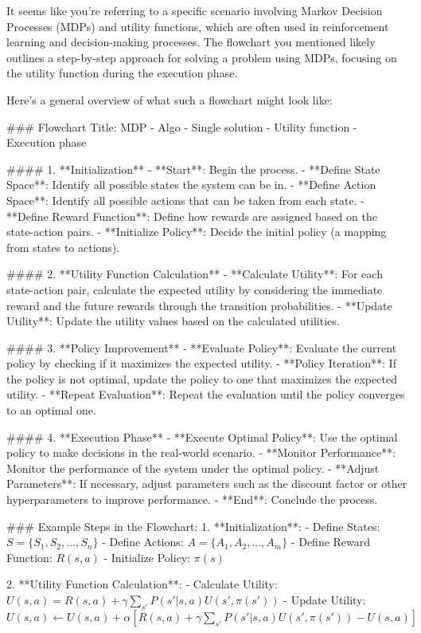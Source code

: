 It seems like you're referring to a specific scenario involving Markov Decision Processes (MDPs) and utility functions, which are often used in reinforcement learning and decision-making processes. The flowchart you mentioned likely outlines a step-by-step approach for solving a problem using MDPs, focusing on the utility function during the execution phase.

Here's a general overview of what such a flowchart might look like:

### Flowchart Title: MDP - Algo - Single solution - Utility function - Execution phase

#### 1. **Initialization**
   - **Start**: Begin the process.
   - **Define State Space**: Identify all possible states the system can be in.
   - **Define Action Space**: Identify all possible actions that can be taken from each state.
   - **Define Reward Function**: Define how rewards are assigned based on the state-action pairs.
   - **Initialize Policy**: Decide the initial policy (a mapping from states to actions).

#### 2. **Utility Function Calculation**
   - **Calculate Utility**: For each state-action pair, calculate the expected utility by considering the immediate reward and the future rewards through the transition probabilities.
   - **Update Utility**: Update the utility values based on the calculated utilities.

#### 3. **Policy Improvement**
   - **Evaluate Policy**: Evaluate the current policy by checking if it maximizes the expected utility.
   - **Policy Iteration**: If the policy is not optimal, update the policy to one that maximizes the expected utility.
   - **Repeat Evaluation**: Repeat the evaluation until the policy converges to an optimal one.

#### 4. **Execution Phase**
   - **Execute Optimal Policy**: Use the optimal policy to make decisions in the real-world scenario.
   - **Monitor Performance**: Monitor the performance of the system under the optimal policy.
   - **Adjust Parameters**: If necessary, adjust parameters such as the discount factor or other hyperparameters to improve performance.
   - **End**: Conclude the process.

### Example Steps in the Flowchart:
1. **Initialization**:
   - Define States: \( S = \{S_1, S_2, ..., S_n\} \)
   - Define Actions: \( A = \{A_1, A_2, ..., A_m\} \)
   - Define Reward Function: \( R(s, a) \)
   - Initialize Policy: \( \pi(s) \)

2. **Utility Function Calculation**:
   - Calculate Utility: \( U(s, a) = R(s, a) + \gamma \sum_{s'} P(s'|s, a) U(s', \pi(s')) \)
   - Update Utility: \( U(s, a) \leftarrow U(s, a) + \alpha [R(s, a) + \gamma \sum_{s'} P(s'|s, a) U(s', \pi(s')) - U(s, a)] \)

